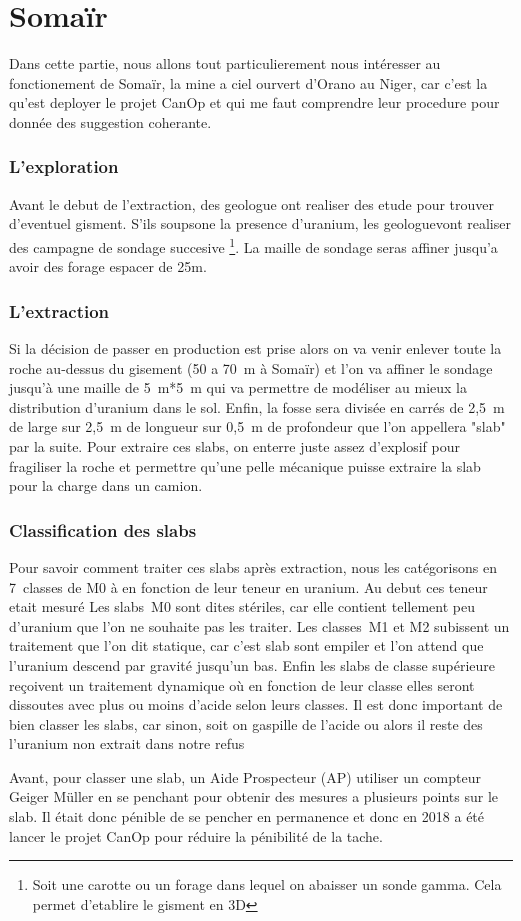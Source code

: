 

\section{Somaïr}
Dans cette partie, nous allons tout particulierement nous intéresser au fonctionement de Somaïr, la mine a ciel ourvert d'Orano au Niger, car c'est la qu'est deployer le projet CanOp et qui me faut comprendre leur procedure pour donnée des suggestion coherante.
\subsubsection{L'exploration}
Avant le debut de l'extraction, des geologue ont realiser des etude pour trouver d'eventuel gisment. S'ils soupsone la presence d'uranium, les geologuevont realiser des campagne de sondage succesive \footnote{Soit une carotte ou un forage dans lequel on abaisser un 
sonde gamma. Cela permet d'etablire le gisment en 3D}. La maille de sondage seras affiner jusqu'a avoir des forage espacer de 25m. 
\subsubsection{L'extraction}
Si la décision de passer en production est prise alors on va venir enlever toute la roche au-dessus du gisement (50 a 70~m à Somaïr) et l’on va affiner le sondage jusqu'à une maille de 5~m*5~m qui va permettre de modéliser au mieux la distribution d'uranium dans le sol. Enfin, la fosse sera divisée en carrés de 2,5~m de large sur 2,5~m de longueur sur 0,5~m de profondeur que l'on appellera "slab" par la suite. Pour extraire ces slabs, on enterre juste assez d'explosif pour fragiliser la roche et permettre qu'une pelle mécanique puisse extraire la slab pour la charge dans un camion.
\subsubsection{Classification des slabs}
Pour savoir comment traiter ces slabs  après extraction, nous les catégorisons en 7~classes de M0 à  en fonction de leur teneur en uranium. Au debut ces teneur etait mesuré  Les slabs~M0 sont dites stériles, car elle contient tellement peu d'uranium que l'on ne souhaite pas les traiter. Les classes~M1 et M2 subissent un traitement que l'on dit statique, car c'est slab sont empiler et l’on attend que l'uranium descend par gravité jusqu'un bas. Enfin les slabs de classe supérieure reçoivent un traitement dynamique où en fonction de leur classe elles seront dissoutes avec plus ou moins d'acide selon leurs classes. Il est donc important de bien classer les slabs, car sinon, soit on gaspille  de l'acide ou alors il reste des l'uranium non extrait dans notre refus

Avant, pour classer une slab, un Aide Prospecteur (AP) utiliser un compteur Geiger Müller en se penchant pour obtenir des mesures a plusieurs points sur le slab. Il était donc pénible de se pencher en permanence et donc en 2018 a été lancer le projet CanOp pour réduire la pénibilité de la tache.